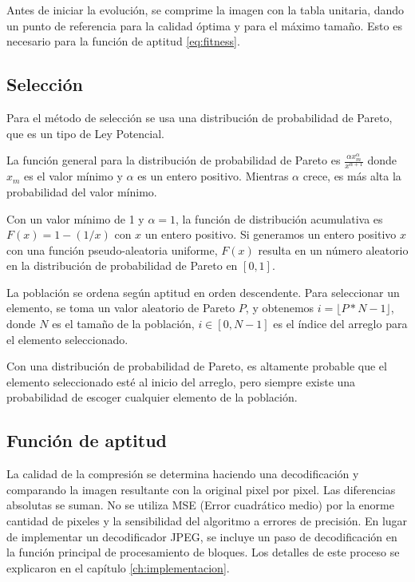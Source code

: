 Antes de iniciar la evolución, se comprime la imagen con la tabla unitaria,
dando un punto de referencia para la calidad óptima y para el máximo tamaño.
Esto es necesario para la función de aptitud \ref{eq:fitness}.

\subsection{ Selección }

Para el método de selección se usa una distribución de probabilidad de Pareto,
que es un tipo de Ley Potencial.

La función general para la distribución de probabilidad de Pareto es $\frac{
\alpha x_m^{\alpha} } { x^{\alpha + 1} }$ donde $x_m$ es el valor mínimo y
$\alpha$ es un entero positivo. Mientras $\alpha$ crece, es más alta la
probabilidad del valor mínimo.

Con un valor mínimo de 1 y $\alpha=1$, la función de distribución acumulativa
es $F(x) = 1 - (1/x)$ con $x$ un entero positivo. Si generamos un entero
positivo $x$ con una función pseudo-aleatoria uniforme, $F(x)$ resulta en un
número aleatorio en la distribución de probabilidad de Pareto en $[0, 1]$.

La población se ordena según aptitud en orden descendente. Para seleccionar un
elemento, se toma un valor aleatorio de Pareto $P$, y obtenemos $i = \lfloor P*N
- 1 \rfloor$, donde $N$ es el tamaño de la población, $i \in [0, N-1]$ es el índice del
arreglo para el elemento seleccionado.

Con una distribución de probabilidad de Pareto, es altamente probable que el
elemento seleccionado esté al inicio del arreglo, pero siempre existe una
probabilidad de escoger cualquier elemento de la población.

\subsection { Función de aptitud }

La calidad de la compresión se determina haciendo una decodificación y
comparando la imagen resultante con la original pixel por pixel. Las
diferencias absolutas se suman. No se utiliza MSE (Error cuadrático medio) por
la enorme cantidad de pixeles y la sensibilidad del algoritmo a errores de
precisión. En lugar de implementar un decodificador JPEG, se incluye un paso de
decodificación en la función principal de procesamiento de bloques. Los
detalles de este proceso se explicaron en el capítulo \ref{ch:implementacion}.

